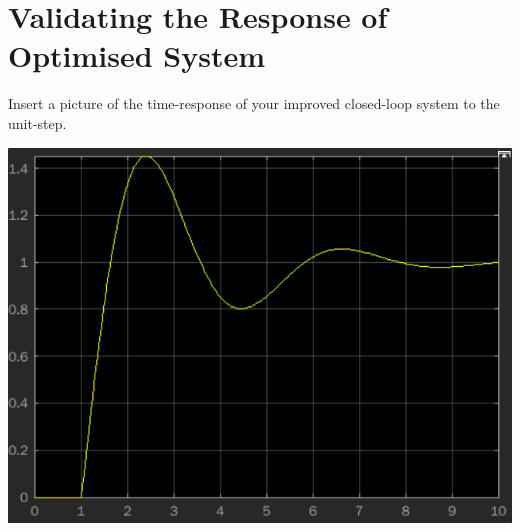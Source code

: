 \section{Validating the Response of Optimised System}

\begin{questions}
\setcounter{question}{\value{lastquestioncounter}}

\question[2H]
Insert a picture of the time-response of your improved closed-loop system to the unit-step.
\begin{solution}
   \begin{minipage}[htbp]{\linewidth}
      \centering
      \includegraphics[scale=0.53]{figures/improved_time_response.png}
   \end{minipage}
\end{solution}

\setcounter{lastquestioncounter}{\value{question}}
\end{questions}
